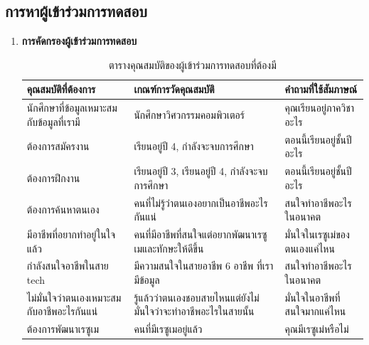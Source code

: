 \subsection{การหาผู้เข้าร่วมการทดสอบ}
\begin{enumerate}
    \item \textbf{การคัดกรองผู้เข้าร่วมการทดสอบ}
          \begin{table}[H]
              \caption{ตารางคุณสมบัติของผู้เข้าร่วมการทดสอบที่ต้องมี}
              \label{tab:my-table}
              \begin{tabularx}{\textwidth}{|X|X|X|}
                  \hline
                  \textbf{คุณสมบัติที่ต้องการ}             & \textbf{เกณฑ์การวัดคุณสมบัติ}                           & \textbf{คำถามที่ใช้สัมภาษณ์}   \\ \hline
                  นักศึกษาที่ข้อมูลเหมาะสมกับข้อมูลที่เรามี      & นักศึกษาวิศวกรรมคอมพิวเตอร์                             & คุณเรียนอยู่ภาควิชาอะไร       \\ \hline
                  ต้องการสมัครงาน                      & เรียนอยู่ปี 4, กำลังจะจบการศึกษา                          & ตอนนี้เรียนอยู่ชั้นปีอะไร        \\ \hline
                  ต้องการฝึกงาน                        & เรียนอยู่ปี 3, เรียนอยู่ปี 4, กำลังจะจบการศึกษา               & ตอนนี้เรียนอยู่ชั้นปีอะไร        \\ \hline
                  ต้องการค้นหาตนเอง                    & คนที่ไม่รู้ว่าตนเองอยากเป็นอาชีพอะไรกันแน่                   & สนใจทำอาชีพอะไรในอนาคต     \\ \hline
                  มีอาชีพที่อยากทำอยู่ในใจแล้ว               & คนที่มีอาชีพที่สนใจแต่อยากพัฒนาเรซูเมและทักษะให้ดีขึ้น           & มั่นใจในเรซูเม่ของตนเองแค่ไหน \\ \hline
                  กำลังสนใจอาชีพในสาย tech              & มีความสนใจในสายอาชีพ 6 อาชีพ ที่เรามีข้อมูล                & สนใจทำอาชีพอะไรในอนาคต     \\ \hline
                  ไม่มั่นใจว่าตนเองเหมาะสมกับอาชีพอะไรกันแน่ & รู้แล้วว่าตนเองชอบสายไหนแต่ยังไม่มั่นใจว่าจะทำอาชีพอะไรในสายนั้น & มั่นใจในอาชีพที่สนใจมากแค่ไหน  \\ \hline
                  ต้องการพัฒนาเรซูเม                    & คนที่มีเรซูเมอยู่แล้ว                                     & คุณมีเรซูเม่หรือไม่            \\ \hline

\end{tabularx}
\end{table}
\end{enumerate}
